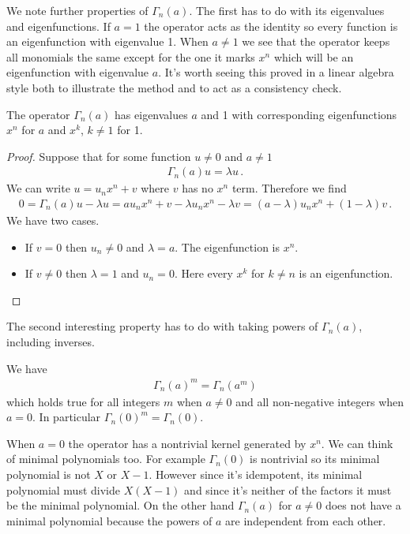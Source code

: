 We note further properties of $\Gamma_n(a)$. The first has to do with its eigenvalues and eigenfunctions. If $a = 1$ the operator acts as the identity so every function is an eigenfunction with eigenvalue 1. When $a \neq 1$ we see that the operator keeps all monomials the same except for the one it marks $x^n$ which will be an eigenfunction with eigenvalue $a$. It's worth seeing this proved in a linear algebra style both to illustrate the method and to act as a consistency check.
\begin{prop} The operator $\Gamma_n(a)$ has eigenvalues $a$ and 1 with corresponding eigenfunctions $x^n$ for $a$ and $x^k$, $k \neq 1$ for 1.
\end{prop}
\begin{proof}
Suppose that for some function $u \neq 0$ and $a \neq 1$
\begin{align}
	\Gamma_n(a) u  = \lambda u\,.
\end{align}
We can write $u = u_n x^n + v$ where $v$ has no $x^n$ term. Therefore we find
\begin{align}
	0 = \Gamma_n(a) u - \lambda u = au_nx^n + v - \lambda u_n x^n -\lambda v = (a-\lambda)u_n x^n + (1-\lambda)v\,.
\end{align}
We have two cases.
\begin{itemize}
\item If $v = 0$ then $u_n \neq 0$ and $\lambda = a$. The eigenfunction is $x^n$.
\item If $v \neq 0$ then $\lambda = 1$ and $u_n = 0$. Here every $x^k$ for $k\neq n$ is an eigenfunction.
\end{itemize}
\end{proof}
The second interesting property has to do with taking powers of $\Gamma_n(a)$, including inverses.
\begin{prop} We have
\begin{align}
	\Gamma_n(a)^m =  \Gamma_n(a^m)
\end{align}
which holds true for all integers $m$ when $a \neq 0$ and all non-negative integers when $a =0$. In particular $\Gamma_n(0)^m = \Gamma_n(0)$.
\end{prop}

When $a = 0$ the operator has a nontrivial kernel generated by $x^n$. We can think of minimal polynomials too. For example $\Gamma_n(0)$ is nontrivial so its minimal polynomial is not $X$ or $X-1$. However since it's idempotent, its minimal polynomial must divide $X(X-1)$ and since it's neither of the factors it must be the minimal polynomial. On the other hand $\Gamma_n(a)$ for $a\neq 0$ does not have a minimal polynomial because the powers of $a$ are independent from each other.

